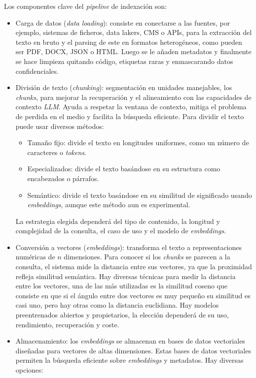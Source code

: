 Los componentes clave del \textit{pipeline} de indexación son:
\begin{itemize}
\tightlist
	\item Carga de datos (\textit{data loading}): consiste en conectarse a las fuentes, por ejemplo, sistemas de ficheros, data lakers, CMS o APIs, para la extracción del texto en bruto y el parsing de este en formatos heterogéneos, como pueden ser PDF, DOCX, JSON o HTML. Luego se le añaden metadatos y finalmente se hace limpieza quitando código, etiquetas raras y enmascarando datos confidenciales.
	\item División de texto (\textit{chunking}): segmentación en unidades manejables, los \textit{chunks}, para mejorar la recuperación y el alineamiento con las capacidades de contexto \textit{LLM}. Ayuda a respetar la ventana de contexto, mitiga el problema de perdida en el medio y facilita la búsqueda eficiente. Para dividir el texto puede usar diversos métodos:
	\begin{itemize}
		\item Tamaño fijo: divide el texto en longitudes uniformes, como un número de caracteres o \textit{tokens}.
		\item Especializados: divide el texto basándose en su estructura como encabezados o párrafos. 
		\item Semántico: divide el texto basándose en su similitud de significado usando \textit{embeddings}, aunque este método aun es experimental.
	\end{itemize}
	La estrategia elegida dependerá del tipo de contenido, la longitud y complejidad de la consulta, el caso de uso y el modelo de \textit{embeddings}.
	\item Conversión a vectores (\textit{embeddings}): transforma el texto a representaciones numéricas de $n$ dimensiones. Para conocer si los \textit{chunks} se parecen a la consulta, el sistema mide la distancia entre sus vectores, ya que la proximidad refleja similitud semántica. Hay diversas técnicas para medir la distancia entre los vectores, una de las más utilizadas es la similitud coseno que consiste en que si el ángulo entre dos vectores es muy pequeño su similitud es casi uno, pero hay otras como la distancia euclidiana. Hay modelos preentrenados abiertos y propietarios, la elección dependerá de su uso, rendimiento, recuperación y coste.
	\item Almacenamiento: los \textit{embeddings} se almacenan en bases de datos vectoriales diseñadas para vectores de altas dimensiones. Estas bases de datos vectoriales permiten la búsqueda eficiente sobre \textit{embeddings} y metadatos. Hay diversas opciones:

\end{itemize}
